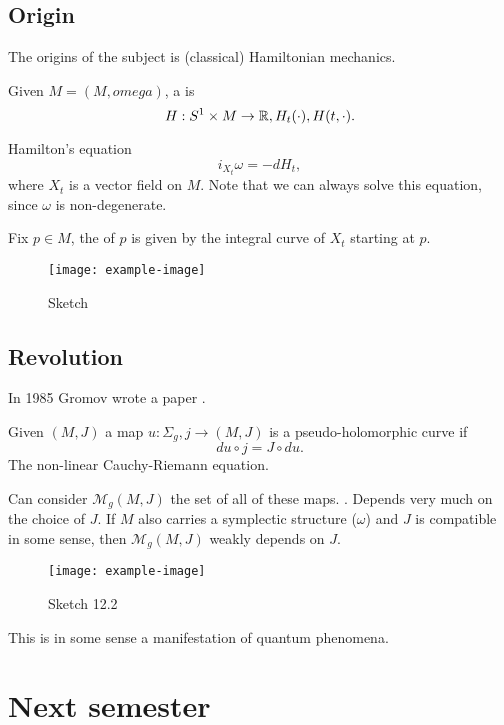 \subsection{Origin}

The origins of the subject is (classical) Hamiltonian mechanics.

Given \(M=(M,omega)\), a  is 
\[H:S^1\times M \to \mathbb{R},H_t(\cdot),H(t,\cdot).\]

Hamilton's equation 
\[i_{X_t}\omega=-dH_t,\]
where \(X_t\) is a vector field on \(M\). Note that we can always solve this equation, since \(\omega\) is non-degenerate.

Fix \(p\in M\), the  of \(p\) is given by the integral curve of 
\(X_t\) starting at \(p\).

\begin{figure}[H]\label{fig:12.1}
    \centering
    \texttt{[image: example-image]}
    \caption{Sketch }
\end{figure}

\subsection{Revolution}

In 1985 Gromov wrote a paper .

\begin{definition*}
    Given  \((M,J)\) a map \(u: \Sigma_g,j\to (M,J)\) is a pseudo-holomorphic curve if 
    \[du\circ j = J\circ du.\]
    The non-linear Cauchy-Riemann equation.

    Can consider \(\mathcal{M}_g(M,J)\) the set of all of these maps. . Depends very much on the choice of \(J\).
    If \(M\) also carries a symplectic structure (\(\omega\)) and \(J\) is compatible in some sense, then 
    \(\mathcal{M}_g(M,J)\) weakly depends on \(J\).
    \begin{figure}[H]\label{fig:12.2}
        \centering
        \texttt{[image: example-image]}
        \caption{Sketch 12.2}
    \end{figure}
\end{definition*}
This is in some sense a manifestation of quantum phenomena.

\section{Next semester}

